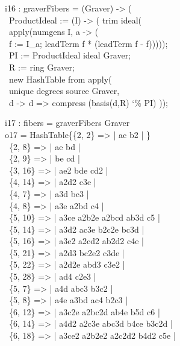 \beginOutput
i16 : graverFibers = (Graver) -> (\\
\           ProductIdeal := (I) -> ( trim ideal(\\
\              apply(numgens I, a -> ( \\
\                  f := I_a; leadTerm f * (leadTerm f - f))))); \\
\           PI := ProductIdeal ideal Graver; \\
\           R := ring Graver; \\
\           new HashTable from apply(\\
\               unique degrees source Graver,\\
\               d -> d => compress (basis(d,R) {\char`\%} PI) ));\\
\endOutput

\beginOutput
i17 : fibers = graverFibers Graver \\
\emptyLine
o17 = HashTable\{\{2, 2\} => | ac b2 |                                  \}\\
\                \{2, 8\} => | ae bd |\\
\                \{2, 9\} => | be cd |\\
\                \{3, 16\} => | ae2 bde cd2 |\\
\                \{4, 14\} => | a2d2 c3e |\\
\                \{4, 7\} => | a3d bc3 |\\
\                \{4, 8\} => | a3e a2bd c4 |\\
\                \{5, 10\} => | a3ce a2b2e a2bcd ab3d c5 |\\
\                \{5, 14\} => | a3d2 ac3e b2c2e bc3d |\\
\                \{5, 16\} => | a3e2 a2cd2 ab2d2 c4e |\\
\                \{5, 21\} => | a2d3 bc2e2 c3de |\\
\                \{5, 22\} => | a2d2e abd3 c3e2 |\\
\                \{5, 28\} => | ad4 c2e3 |\\
\                \{5, 7\} => | a4d abc3 b3c2 |\\
\                \{5, 8\} => | a4e a3bd ac4 b2c3 |\\
\                \{6, 12\} => | a3c2e a2bc2d ab4e b5d c6 |\\
\                \{6, 14\} => | a4d2 a2c3e abc3d b4ce b3c2d |\\
\                \{6, 18\} => | a3ce2 a2b2e2 a2c2d2 b4d2 c5e |\\
